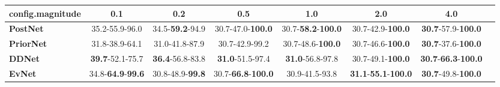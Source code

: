 \begin{tabular}{lccccccc}
\toprule
\textbf{config.magnitude} &                               0.1 &                      0.2 &                                0.5 &                                1.0 &                                         2.0 &                                         4.0 \\
\midrule
\textbf{PostNet } &                    35.2-55.9-96.0 &  34.5-\textbf{59.2}-94.9 &           30.7-47.0-\textbf{100.0} &  30.7-\textbf{58.2}-\textbf{100.0} &                    30.7-42.9-\textbf{100.0} &           \textbf{30.7}-57.9-\textbf{100.0} \\
\textbf{PriorNet} &                    31.8-38.9-64.1 &           31.0-41.8-87.9 &                     30.7-42.9-99.2 &           30.7-48.6-\textbf{100.0} &                    30.7-46.6-\textbf{100.0} &           \textbf{30.7}-37.6-\textbf{100.0} \\
\textbf{DDNet   } &           \textbf{39.7}-52.1-75.7 &  \textbf{36.4}-56.8-83.8 &            \textbf{31.0}-51.5-97.4 &            \textbf{31.0}-56.8-97.8 &                    30.7-49.1-\textbf{100.0} &  \textbf{30.7}-\textbf{66.3}-\textbf{100.0} \\
\textbf{EvNet   } &  34.8-\textbf{64.9}-\textbf{99.6} &  30.8-48.9-\textbf{99.8} &  30.7-\textbf{66.8}-\textbf{100.0} &                     30.9-41.5-93.8 &  \textbf{31.1}-\textbf{55.1}-\textbf{100.0} &           \textbf{30.7}-49.8-\textbf{100.0} \\
\bottomrule
\end{tabular}
